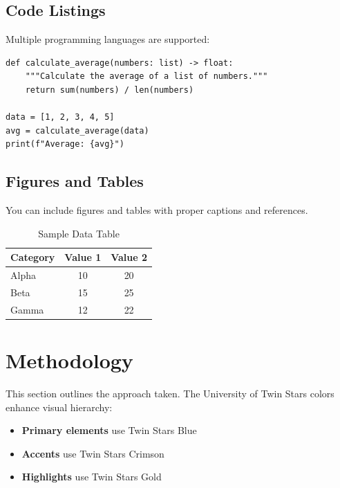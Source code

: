 \documentclass[11pt]{article}
\begin{document}
\subsection{Code Listings}

Multiple programming languages are supported:

\begin{lstlisting}[style=pythonstyle, caption=Python Example]
def calculate_average(numbers: list) -> float:
    """Calculate the average of a list of numbers."""
    return sum(numbers) / len(numbers)

data = [1, 2, 3, 4, 5]
avg = calculate_average(data)
print(f"Average: {avg}")
\end{lstlisting}

\subsection{Figures and Tables}

You can include figures and tables with proper captions and references.

\begin{table}[h]
    \centering
    \caption{Sample Data Table}
    \begin{tabular}{|l|c|c|}
        \hline
        \textbf{Category} & \textbf{Value 1} & \textbf{Value 2} \\
        \hline
        Alpha             & 10               & 20               \\
        Beta              & 15               & 25               \\
        Gamma             & 12               & 22               \\
        \hline
    \end{tabular}
\end{table}

\section{Methodology}

This section outlines the approach taken. The University of Twin Stars colors enhance visual hierarchy:

\begin{itemize}
    \item \textcolor{TwinStarsBlue}{\textbf{Primary elements}} use Twin Stars Blue
    \item \textcolor{TwinStarsCrimson}{\textbf{Accents}} use Twin Stars Crimson
    \item \textcolor{TwinStarsGold}{\textbf{Highlights}} use Twin Stars Gold
\end{itemize}
\end{document}
